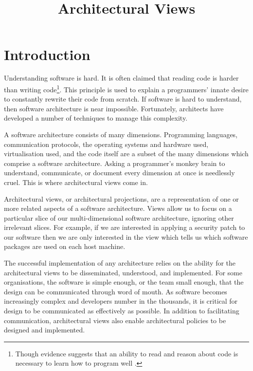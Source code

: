 \title{Architectural Views}
\maketitle

\section{Introduction}

Understanding software is hard.
It is often claimed that reading code is harder than writing code\footnote{Though evidence suggests that an ability to read and reason 
about code is necessary to learn how to program well \cite{lister-tracing-explaining-writing} \cite{lister-neo-piagetian}.}.
This principle is used to explain a programmers' innate desire to constantly rewrite their code from scratch.
If software is hard to understand, then software architecture is near impossible.
Fortunately, architects have developed a number of techniques to manage this complexity.

A software architecture consists of many dimensions.
Programming languages, communication protocols, the operating systems and hardware used, virtualisation used,
and the code itself are a subset of the many dimensions which comprise a software architecture.
Asking a programmer's monkey brain to understand, communicate, or document every dimension at once is needlessly cruel.
This is where architectural views come in.

Architectural views, or architectural projections, are a representation of one or more related aspects of a software architecture.
Views allow us to focus on a particular slice of our multi-dimensional software architecture, ignoring other irrelevant slices.
For example, if we are interested in applying a security patch to our software then we are only interested in the view
which tells us which software packages are used on each host machine.

The successful implementation of any architecture relies on the ability for the architectural views
to be disseminated, understood, and implemented.
For some organisations, the software is simple enough, or the team small enough, that the design
can be communicated through word of mouth.
As software becomes increasingly complex and developers number in the thousands,
it is critical for design to be communicated as effectively as possible.
In addition to facilitating communication,
architectural views also enable architectural policies to be designed and implemented.

